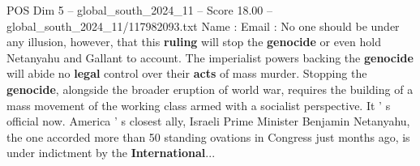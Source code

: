 \begin{textsample}{POS Dim 5 – global\_south\_2024\_11 – Score 18.00 – global\_south\_2024\_11/117982093.txt}
Name : Email : No one should be under any illusion, however, that this \textbf{ruling} will stop the \textbf{genocide} or even hold Netanyahu and Gallant to account.
The imperialist powers backing the \textbf{genocide} will abide no \textbf{legal} control over their \textbf{acts} of mass murder.
Stopping the \textbf{genocide}, alongside the broader eruption of world war, requires the building of a mass movement of the working class armed with a socialist perspective.
It ' s official now.
America ' s closest ally, Israeli Prime Minister Benjamin Netanyahu, the one accorded more than 50 standing ovations in Congress just months ago, is under indictment by the \textbf{International}...

\end{textsample}
